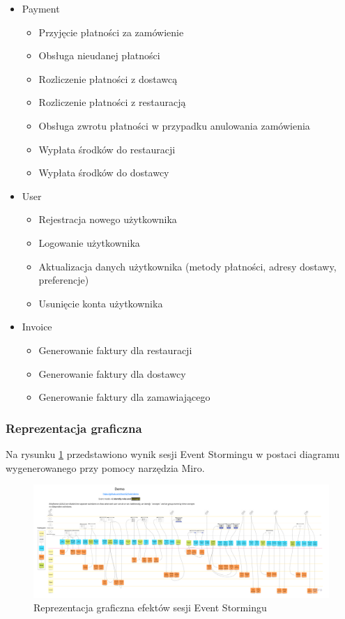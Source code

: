 \begin{itemize}
    \item Payment
    \begin{itemize}
        \item Przyjęcie płatności za zamówienie
        \item Obsługa nieudanej płatności
        \item Rozliczenie płatności z dostawcą
        \item Rozliczenie płatności z restauracją
        \item Obsługa zwrotu płatności w przypadku anulowania zamówienia
        \item Wypłata środków do restauracji
        \item Wypłata środków do dostawcy
    \end{itemize}
    
    \item User
    \begin{itemize}
        \item Rejestracja nowego użytkownika
        \item Logowanie użytkownika
        \item Aktualizacja danych użytkownika (metody płatności, adresy dostawy, preferencje)
        \item Usunięcie konta użytkownika
    \end{itemize}
    
    \item Invoice
    \begin{itemize}
        \item Generowanie faktury dla restauracji
        \item Generowanie faktury dla dostawcy
        \item Generowanie faktury dla zamawiającego
    \end{itemize}
\end{itemize}


\subsubsection{Reprezentacja graficzna}

Na rysunku \ref{fig:event-storming} przedstawiono wynik sesji Event Stormingu w postaci diagramu wygenerowanego przy pomocy narzędzia Miro.

\begin{figure}[!h]
    \centering \includegraphics[width=1.0\linewidth]{event_storming.png}
    \caption{Reprezentacja graficzna efektów sesji Event Stormingu}
    \label{fig:event-storming}
\end{figure}



